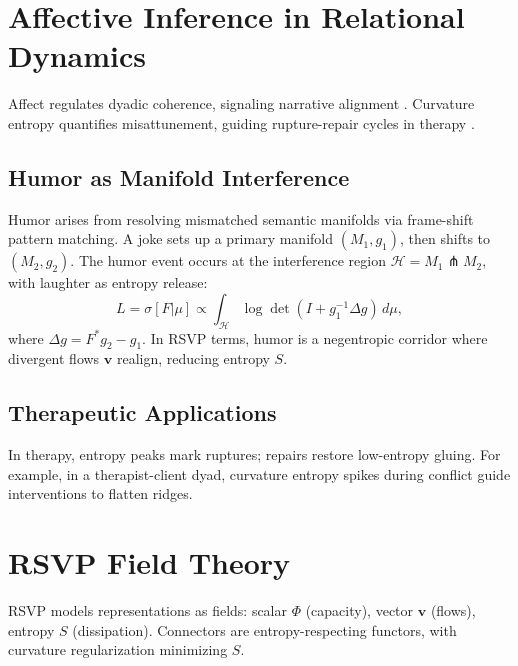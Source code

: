 \documentclass{article}
\theoremstyle{definition}
\begin{document}
\section{Affective Inference in Relational Dynamics}
Affect regulates dyadic coherence, signaling narrative alignment \cite{friston2017graphical}. Curvature entropy quantifies misattunement, guiding rupture-repair cycles in therapy \cite{adel2025systematic}.

\subsection{Humor as Manifold Interference}
Humor arises from resolving mismatched semantic manifolds via frame-shift pattern matching. A joke sets up a primary manifold $(M_1, g_1)$, then shifts to $(M_2, g_2)$. The humor event occurs at the interference region $\mathcal{H} = M_1 \pitchfork M_2$, with laughter as entropy release:
\[
L = \sigma[F|\mu] \propto \int_{\mathcal{H}} \log \det (I + g_1^{-1} \Delta g) \, d\mu,
\]
where $\Delta g = F^* g_2 - g_1$. In RSVP terms, humor is a negentropic corridor where divergent flows $\mathbf{v}$ realign, reducing entropy $S$.

\subsection{Therapeutic Applications}
In therapy, entropy peaks mark ruptures; repairs restore low-entropy gluing. For example, in a therapist-client dyad, curvature entropy spikes during conflict guide interventions to flatten ridges.

\section{RSVP Field Theory}
RSVP models representations as fields: scalar $\Phi$ (capacity), vector $\mathbf{v}$ (flows), entropy $S$ (dissipation). Connectors are entropy-respecting functors, with curvature regularization minimizing $S$.
\end{document}
